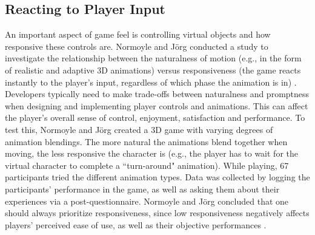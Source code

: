\subsection{Reacting to Player Input}
An important aspect of game feel is controlling virtual objects and how responsive these controls are. Normoyle and J\"{o}rg conducted a study to investigate the relationship between the naturalness of motion (e.g., in the form of realistic and adaptive 3D animations) versus responsiveness (the game reacts instantly to the player's input, regardless of which phase the animation is in) \cite{normoyle_trade-offs_2014}. Developers typically need to make trade-offs between naturalness and promptness when designing and implementing player controls and animations. This can affect the player's overall sense of control, enjoyment, satisfaction and performance. To test this, Normoyle and J\"{o}rg  created a 3D game with varying degrees of animation blendings. The more natural the animations blend together when moving, the less responsive the character is (e.g., the player has to wait for the virtual character to complete a ``turn-around" animation). While playing, 67 participants tried the different animation types.  Data was collected by logging the participants' performance in the game, as well as asking them about their experiences via a post-questionnaire. Normoyle and J\"{o}rg concluded that one should always prioritize responsiveness, since low responsiveness negatively affects players' perceived ease of use, as well as their objective performances \cite{normoyle_trade-offs_2014}.



